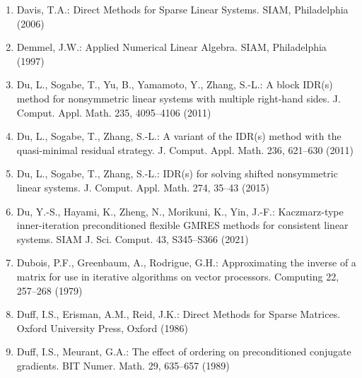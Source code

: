 \begin{enumerate}[label=\arabic*.,ref=\arabic*,leftmargin=3em]
\item\label{bib:source-44}Davis, T.A.: Direct Methods for Sparse Linear Systems. SIAM, Philadelphia (2006)

\item\label{bib:source-45}Demmel, J.W.: Applied Numerical Linear Algebra. SIAM, Philadelphia (1997)

\item\label{bib:source-46}Du, L., Sogabe, T., Yu, B., Yamamoto, Y., Zhang, S.-L.: A block IDR(s) method for nonsymmetric linear systems with multiple right-hand sides. J. Comput. Appl. Math. 235, 4095–4106 (2011)

\item\label{bib:source-47}Du, L., Sogabe, T., Zhang, S.-L.: A variant of the IDR(s) method with the quasi-minimal residual strategy. J. Comput. Appl. Math. 236, 621–630 (2011)

\item\label{bib:source-48}Du, L., Sogabe, T., Zhang, S.-L.: IDR(s) for solving shifted nonsymmetric linear systems. J. Comput. Appl. Math. 274, 35–43 (2015)

\item\label{bib:source-49}Du, Y.-S., Hayami, K., Zheng, N., Morikuni, K., Yin, J.-F.: Kaczmarz-type inner-iteration preconditioned flexible GMRES methods for consistent linear systems. SIAM J. Sci. Comput. 43, S345–S366 (2021)

\item\label{bib:source-50}Dubois, P.F., Greenbaum, A., Rodrigue, G.H.: Approximating the inverse of a matrix for use in iterative algorithms on vector processors. Computing 22, 257–268 (1979)

\item\label{bib:source-51}Duff, I.S., Erisman, A.M., Reid, J.K.: Direct Methods for Sparse Matrices. Oxford University Press, Oxford (1986)

\item\label{bib:source-52}Duff, I.S., Meurant, G.A.: The effect of ordering on preconditioned conjugate gradients. BIT Numer. Math. 29, 635–657 (1989)


\end{enumerate}
